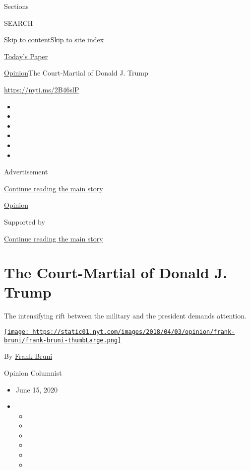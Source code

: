Sections

SEARCH

\protect\hyperlink{site-content}{Skip to
content}\protect\hyperlink{site-index}{Skip to site index}

\href{https://myaccount.nytimes.com/auth/login?response_type=cookie\&client_id=vi}{}

\href{https://www.nytimes.com/section/todayspaper}{Today's Paper}

\href{/section/opinion}{Opinion}\textbar{}The Court-Martial of Donald J.
Trump

\href{https://nyti.ms/2B46slP}{https://nyti.ms/2B46slP}

\begin{itemize}
\item
\item
\item
\item
\item
\item
\end{itemize}

Advertisement

\protect\hyperlink{after-top}{Continue reading the main story}

\href{/section/opinion}{Opinion}

Supported by

\protect\hyperlink{after-sponsor}{Continue reading the main story}

\hypertarget{the-court-martial-of-donald-j-trump}{%
\section{The Court-Martial of Donald J.
Trump}\label{the-court-martial-of-donald-j-trump}}

The intensifying rift between the military and the president demands
attention.

\href{https://www.nytimes.com/by/frank-bruni}{\texttt{[image: https://static01.nyt.com/images/2018/04/03/opinion/frank-bruni/frank-bruni-thumbLarge.png]}}

By \href{https://www.nytimes.com/by/frank-bruni}{Frank Bruni}

Opinion Columnist

\begin{itemize}
\item
  June 15, 2020
\item
  \begin{itemize}
  \item
  \item
  \item
  \item
  \item
  \item
  \end{itemize}
\end{itemize}

